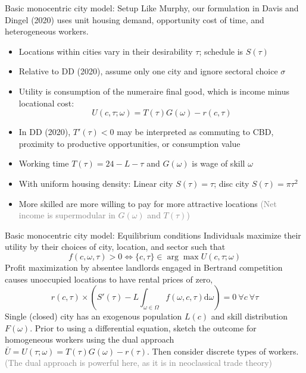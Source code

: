\documentclass[11pt,notes=hide,aspectratio=169]{beamer}
\begin{document}
\begin{frame}{Basic monocentric city model: Setup}
Like Murphy, our formulation in Davis and Dingel (2020)
uses unit housing demand, opportunity cost of time, and heterogeneous workers.
\begin{itemize}
\item Locations within cities vary in their desirability $\tau$; schedule is $S(\tau)$ 
\item Relative to DD (2020), assume only one city and ignore sectoral choice $\sigma$
\item Utility is consumption of the numeraire final good, which is income minus locational cost:
\begin{equation*}
U(c,\tau;\omega)
=
T(\tau)G(\omega)-r(c,\tau)
\end{equation*}
\item In DD (2020), $T'(\tau)<0$ may be interpreted as commuting to CBD, proximity to
productive opportunities, or consumption value
\item Working time $T(\tau) = 24 - L - \tau$ and $G(\omega)$ is wage of skill $\omega$
\item With uniform housing density: Linear city $S(\tau) = \tau$; disc city $S(\tau) = \pi \tau^{2}$
\item More skilled are more willing to pay for more attractive locations
\textcolor{gray}{(Net income is supermodular in $G(\omega)$ and $T(\tau)$)}
\end{itemize}
\end{frame}
\begin{frame}{Basic monocentric city model: Equilibrium conditions}
Individuals maximize their utility by their choices of city, location, and sector such that
\begin{equation*}
f(c,\omega,\tau)>0\iff\{c,\tau\}\in\arg\max U(c,\tau;\omega)
\end{equation*}
Profit maximization by absentee landlords engaged in Bertrand competition causes unoccupied locations to have rental prices of zero,
\begin{equation*}
r(c,\tau)\times\left(S'(\tau)-L \int_{\omega\in\Omega}f(\omega,c,\tau)\textrm{d}\omega\right)=0\ \forall c\ \forall\tau
\end{equation*}
Single (closed) city has an exogenous population $L(c)$ and skill distribution $F(\omega)$.
\medskip
Prior to using a differential equation,
sketch the outcome for homogeneous workers using the dual approach 
$\bar{U} = U(\tau; \omega) = T(\tau) G(\omega) - r(\tau)$.
Then consider discrete types of workers.
\textcolor{gray}{(The dual approach is powerful here, as it is in neoclassical trade theory)}
\end{frame}
\end{document}
